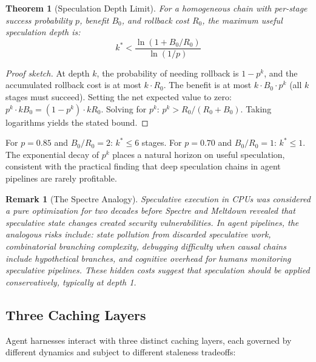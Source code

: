\documentclass[11pt, a4paper]{googledeepmind}
\newtheorem{theorem}{Theorem}[section]
\newtheorem*{remark}{Remark}
\begin{document}
\begin{theorem}[Speculation Depth Limit]
\label{thm:depth-limit}
For a homogeneous chain with per-stage success probability $p$, benefit $B_0$, and rollback cost $R_0$, the maximum useful speculation depth is:
\begin{equation}
    k^* < \frac{\ln(1 + B_0/R_0)}{\ln(1/p)}
\end{equation}
\end{theorem}

\begin{proof}[Proof sketch]
At depth $k$, the probability of needing rollback is $1 - p^k$, and the accumulated rollback cost is at most $k \cdot R_0$. The benefit is at most $k \cdot B_0 \cdot p^k$ (all $k$ stages must succeed). Setting the net expected value to zero: $p^k \cdot k B_0 = (1 - p^k) \cdot k R_0$. Solving for $p^k$: $p^k > R_0/(R_0 + B_0)$. Taking logarithms yields the stated bound.
\end{proof}

For $p = 0.85$ and $B_0/R_0 = 2$: $k^* \leq 6$ stages. For $p = 0.70$ and $B_0/R_0 = 1$: $k^* \leq 1$. The exponential decay of $p^k$ places a natural horizon on useful speculation, consistent with the practical finding that deep speculation chains in agent pipelines are rarely profitable.

\begin{remark}[The Spectre Analogy]
Speculative execution in CPUs was considered a pure optimization for two decades before Spectre and Meltdown revealed that speculative state changes created security vulnerabilities. In agent pipelines, the analogous risks include: state pollution from discarded speculative work, combinatorial branching complexity, debugging difficulty when causal chains include hypothetical branches, and cognitive overhead for humans monitoring speculative pipelines. These hidden costs suggest that speculation should be applied conservatively, typically at depth 1.
\end{remark}

\subsection{Three Caching Layers}

Agent harnesses interact with three distinct caching layers, each governed by different dynamics and subject to different staleness tradeoffs:
\end{document}
